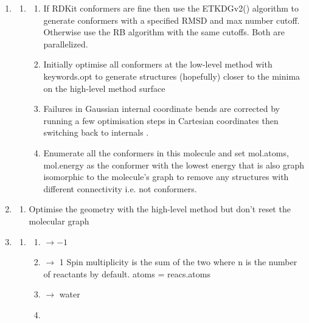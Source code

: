\documentclass[../../main.tex]{subfiles}
\begin{document}
\begin{enumerate}
	\item  {}
	
	\begin{enumerate}
		\item {}
	
		\begin{enumerate}
			\item {}
			If RDKit conformers are fine then use the
			ETKDGv2() algorithm to generate 
			conformers with a specified RMSD and
			max number cutoff. Otherwise use the RB
			algorithm with the same cutoffs. Both 
			are parallelized.
			
			\item {}
			Initially optimise all conformers at the
			low-level method with keywords.opt to
			generate structures (hopefully) closer to
			the minima on the high-level method 
			surface
			
			\item {}
			Failures in Gaussian internal coordinate
			bends are corrected by running a few
			optimisation steps in Cartesian
			coordinates then switching back to
			internals .
			
			\item {}
			Enumerate all the conformers in this
			molecule and set mol.atoms, mol.energy
			as the conformer with the lowest energy
			that is also graph isomorphic to the
			molecule’s graph to remove any 
			structures with different connectivity i.e.
			not conformers.
		\end{enumerate}
	\end{enumerate}
	
	\item {}
	\begin{enumerate}
		\item {}
		Optimise the geometry with the high-level method
		but don’t reset the molecular graph
	\end{enumerate}
	
	\item {}
	
	\begin{enumerate}
		\item {}
		\begin{enumerate}
			\item {} $\rightarrow -1$
			\item {} $\rightarrow$ 1
			Spin multiplicity is the sum of the two where n is 
			the number of reactants by default.
			atoms = reacs.atoms
			\item {} $\rightarrow$ water
			\item {}
		\end{enumerate}
		

\end{enumerate}
\end{enumerate}
\end{document}
